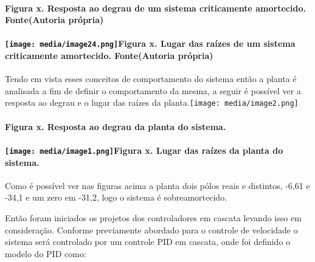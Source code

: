 \documentclass[]{article}
\let\oldparagraph\paragraph
\renewcommand{\paragraph}[1]{\oldparagraph{#1}\mbox{}}
\begin{document}
\paragraph{Figura x. Resposta ao degrau de um sistema criticamente
amortecido. Fonte(Autoria
própria)}\label{figura-x.-resposta-ao-degrau-de-um-sistema-criticamente-amortecido.-fonteautoria-pruxf3pria}

\paragraph{\texorpdfstring{\protect\texttt{[image: media/image24.png]}\textbf{Figura
x. Lugar das raízes de um sistema} criticamente \textbf{amortecido.
Fonte(Autoria
própria)}}{Figura x. Lugar das raízes de um sistema criticamente amortecido. Fonte(Autoria própria)}}\label{figura-x.-lugar-das-rauxedzes-de-um-sistema-criticamente-amortecido.-fonteautoria-pruxf3pria}

Tendo em vista esses conceitos de comportamento do sistema então a
planta é analisada a fim de definir o comportamento da mesma, a seguir é
possível ver a resposta ao degrau e o lugar das raízes da
planta.\texttt{[image: media/image2.png]}

\paragraph{Figura x. Resposta ao degrau da planta do
sistema.}\label{figura-x.-resposta-ao-degrau-da-planta-do-sistema.}

\paragraph{\texorpdfstring{\protect\texttt{[image: media/image1.png]}\textbf{Figura
x.} Lugar das raízes \textbf{da planta do
sistema.}}{Figura x. Lugar das raízes da planta do sistema.}}\label{figura-x.-lugar-das-rauxedzes-da-planta-do-sistema.}

Como é possível ver nas figuras acima a planta dois pólos reais e
distintos, -6,61 e -34,1 e um zero em -31,2, logo o sistema é
sobreamortecido.

Então foram iniciados os projetos dos controladores em cascata levando
isso em consideração. Conforme previamente abordado para o controle de
velocidade o sistema será controlado por um controle PID em cascata,
onde foi definido o modelo do PID como:
\end{document}
